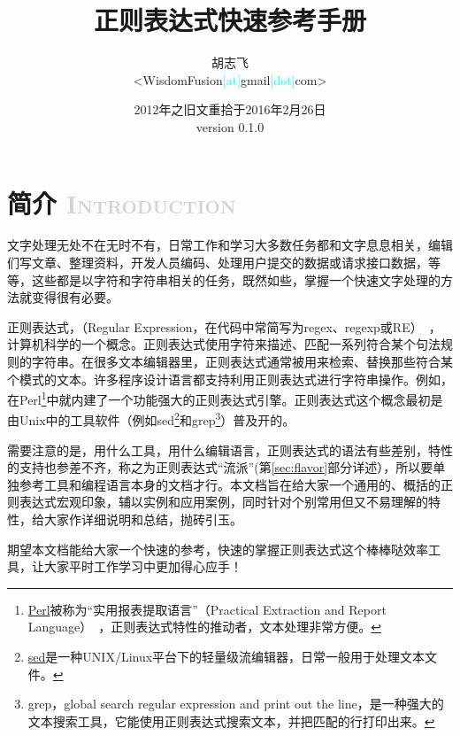 \documentclass[12pt,a4paper,twoside]{ctexart}
\begin{document}
\title{\textbf{正则表达式快速参考手册}}
\author{胡志飞\\<WisdomFusion\textcolor{cyan}{\small [at]}gmail\textcolor{cyan}{\small [dot]}com>}
\date{\color{OrangeRed}2012年之旧文重拾于2016年2月26日\\version 0.1.0}

\maketitle{}
\thispagestyle{empty}
\clearpage{}

\begin{multicols}{2}
\tableofcontents
\end{multicols}

\thispagestyle{empty}
\clearpage{}

\setcounter{page}{1}

\section[简介]{简介 \textcolor{lightgray}{\textsc{Introduction}}}
\label{sec:intro}
文字处理无处不在无时不有，日常工作和学习大多数任务都和文字息息相关，编辑们写文章、整理资料，开发人员编码、处理用户提交的数据或请求接口数据，等等，这些都是以字符和字符串相关的任务，既然如些，掌握一个快速文字处理的方法就变得很有必要。\par
正则表达式，（Regular Expression，在代码中常简写为regex、regexp或RE）~，计算机科学的一个概念。正则表达式使用字符来描述、匹配一系列符合某个句法规则的字符串。在很多文本编辑器里，正则表达式通常被用来检索、替换那些符合某个模式的文本。许多程序设计语言都支持利用正则表达式进行字符串操作。例如，在Perl\footnote{\href{https://www.perl.org/}{Perl}被称为“实用报表提取语言”（Practical Extraction and Report Language）~，正则表达式特性的推动者，文本处理非常方便。}中就内建了一个功能强大的正则表达式引擎。正则表达式这个概念最初是由Unix中的工具软件（例如sed\footnote{\href{http://www.gnu.org/software/sed/manual/sed.html}{sed}是一种UNIX/Linux平台下的轻量级流编辑器，日常一般用于处理文本文件。}和grep\footnote{grep，global search regular expression and print out the line，是一种强大的文本搜索工具，它能使用正则表达式搜索文本，并把匹配的行打印出来。}）普及开的。\par
需要注意的是，用什么工具，用什么编辑语言，正则表达式的语法有些差别，特性的支持也参差不齐，称之为正则表达式“流派”(第\ref{sec:flavor}部分详述），所以要单独参考工具和编程语言本身的文档才行。本文档旨在给大家一个通用的、概括的正则表达式宏观印象，辅以实例和应用案例，同时针对个别常用但又不易理解的特性，给大家作详细说明和总结，抛砖引玉。\par
期望本文档能给大家一个快速的参考，快速的掌握正则表达式这个棒棒哒效率工具，让大家平时工作学习中更加得心应手！\Smiley{} \par
\end{document}
